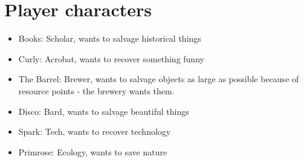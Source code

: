 \section{Player characters}

\begin{itemize}
\item Books: Scholar, wants to salvage historical things
\item Curly: Acrobat, wants to recover something funny
\item The Barrel: Brewer, wants to salvage objects as large as possible because of resource points - the brewery wants them.
\item Disco: Bard, wants to salvage beautiful things
\item Spark: Tech, wants to recover technology
\item Primrose: Ecology, wants to save nature
\end{itemize}

